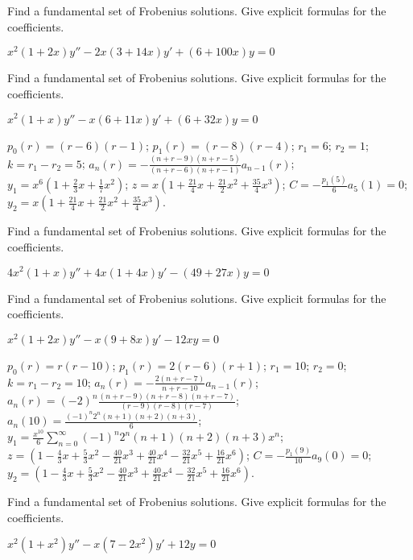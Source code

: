 \documentclass{ximera}
\begin{document}
\begin{problem}\label{exer:7.7.19}
Find
a fundamental set  of Frobenius solutions. Give explicit formulas for
the coefficients.

$x^2(1+2x)y''-2x(3+14x)y'+(6+100x)y=0$
\end{problem}

\begin{problem}\label{exer:7.7.20}
Find
a fundamental set  of Frobenius solutions. Give explicit formulas for
the coefficients.

$x^2(1+x)y''-x(6+11x)y'+(6+32x)y=0$
\begin{solution}
    $p_0(r)=(r-6)(r-1)$;
$p_1(r)=(r-8)(r-4)$;
$r_1=6$; $r_2=1$; $k=r_1-r_2=5$;
$a_n(r)=-\frac{(n+r-9)(n+r-5)}{(n+r-6)(n+r-1)}
a_{n-1}(r)$;
$y_1=x^6\left(1+\frac{2}{3}x+\frac{1}{7}x^2\right)$;
$z=x\left(1+\frac{21}{4}x+\frac{21}{2}x^2+\frac{35}{4}x^3\right)$;
$C=-\frac{p_1(5)}{6}a_5(1)=0$;
$y_2=x\left(1+\frac{21}{4}x+\frac{21}{2}x^2+\frac{35}{4}x^3\right)$.
\end{solution}
\end{problem}

\begin{problem}\label{exer:7.7.21}
Find
a fundamental set  of Frobenius solutions. Give explicit formulas for
the coefficients.

$4x^2(1+x)y''+4x(1+4x)y'-(49+27x)y=0$
\end{problem}

\begin{problem}\label{exer:7.7.22}
Find
a fundamental set  of Frobenius solutions. Give explicit formulas for
the coefficients.

$x^2(1+2x)y''-x(9+8x)y'-12xy=0$
\begin{solution}
    $p_0(r)=r(r-10)$;
$p_1(r)=2(r-6)(r+1)$;
$r_1=10$; $r_2=0$; $k=r_1-r_2=10$;
$a_n(r)= -\frac{2(n+r-7)}{ n+r-10}a_{n-1}(r)$;
 $a_n(r)=(-2)^n\frac{(n+r-9)(n+r-8)(n+r-7)}{(r-9)(r-8)(r-7)}$;
$a_n(10)=\frac{(-1)^n2^n(n+1)(n+2)(n+3)}{6}$;
$y_1=\frac{x^{10}}{6}\sum_{n=0}^\infty(-1)^n2^n(n+1)(n+2)(n+3)x^n$;
$z=\left(1-\frac{4}{3}x+\frac{5}{3}x^2-\frac{40}{21}x^3
+\frac{40}{21}x^4-\frac{32}{21}x^5+\frac{16}{21}x^6\right)$;
$C=-\frac{p_1(9)}{10}a_9(0)=0$;
$y_2=\left(1-\frac{4}{3}x+\frac{5}{3}x^2-\frac{40}{21}x^3
+\frac{40}{21}x^4-\frac{32}{21}x^5+\frac{16}{21}x^6\right)$.
\end{solution}
\end{problem}



\begin{problem}\label{exer:7.7.23}
Find
a fundamental set  of Frobenius solutions. Give explicit formulas for
the coefficients.

$x^2(1+x^2)y''-x(7-2x^2)y'+12y=0$
\end{problem}
\end{document}
